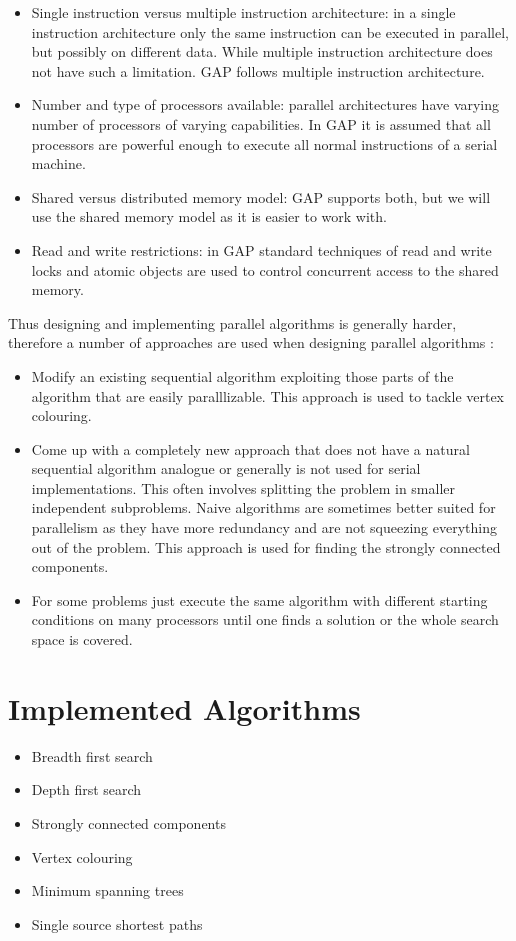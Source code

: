 \documentclass{report}
\theoremstyle{plain}
\theoremstyle{definition}
\theoremstyle{remark}
\numberwithin{definition}{chapter}
\numberwithin{example}{chapter}
\numberwithin{figure}{chapter}
\numberwithin{theorem}{chapter}
\numberwithin{lemma}{chapter}
\begin{document}
\begin{itemize}
  \item Single instruction versus multiple instruction architecture: in a single instruction architecture only the same instruction can be executed in parallel, but possibly on different data. While multiple instruction architecture does not have such a limitation. GAP follows multiple instruction architecture.
  \item Number and type of processors available: parallel architectures have varying number of processors of varying capabilities. In GAP it is assumed that all processors are powerful enough to execute all normal instructions of a serial machine.
  \item Shared versus distributed memory model: GAP supports both, but we will use the shared memory model as it is easier to work with.
  \item Read and write restrictions: in GAP standard techniques of read and write locks and atomic objects are used to control concurrent access to the shared memory.
\end{itemize}

Thus designing and implementing parallel algorithms is generally harder, therefore a number of approaches are used when designing parallel algorithms \cite{berman1996fundamentals}:
\begin{itemize}
  \item Modify an existing sequential algorithm exploiting those parts of the algorithm that are easily paralllizable. This approach is used to tackle vertex colouring.
  \item Come up with a completely new approach that does not have a natural sequential algorithm analogue or generally is not used for serial implementations. This often involves splitting the problem in smaller independent subproblems. Naive algorithms are sometimes better suited for parallelism as they have more redundancy and are not squeezing everything out of the problem. This approach is used for finding the strongly connected components.
  \item For some problems just execute the same algorithm with different starting conditions on many processors until one finds a solution or the whole search space is covered.
\end{itemize}

\section{Implemented Algorithms}
\begin{itemize}
  \item Breadth first search
  \item Depth first search
  \item Strongly connected components
  \item Vertex colouring
  \item Minimum spanning trees
  \item Single source shortest paths
\end{itemize}
\end{document}
